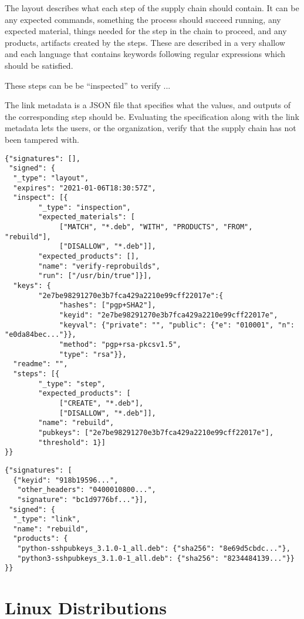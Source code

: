 \documentclass[../Main/thesis.tex]{subfiles}
\begin{document}
The layout describes what each step of the supply chain should contain. It can
be any expected commands, something the process should succeed running, any
expected material, things needed for the step in the chain to proceed, and any
products, artifacts created by the steps. These are described in a very shallow
and each language that contains keywords following regular expressions which
should be satisfied.

These steps can be be ``inspected'' to verify ...

The link metadata is a JSON file that specifies what the values, and outputs of
the corresponding step should be. Evaluating the specification along with the
link metadata lets the users, or the organization, verify that the supply chain
has not been tampered with. 

\begin{verbatim}
{"signatures": [],
 "signed": {
  "_type": "layout",
  "expires": "2021-01-06T18:30:57Z",
  "inspect": [{
        "_type": "inspection",
        "expected_materials": [
             ["MATCH", "*.deb", "WITH", "PRODUCTS", "FROM", "rebuild"],
             ["DISALLOW", "*.deb"]],
        "expected_products": [],
        "name": "verify-reprobuilds",
        "run": ["/usr/bin/true"]}],
  "keys": {
        "2e7be98291270e3b7fca429a2210e99cff22017e":{
             "hashes": ["pgp+SHA2"],
             "keyid": "2e7be98291270e3b7fca429a2210e99cff22017e",
             "keyval": {"private": "", "public": {"e": "010001", "n": "e0da84bec..."}},
             "method": "pgp+rsa-pkcsv1.5",
             "type": "rsa"}},
  "readme": "",
  "steps": [{
        "_type": "step",
        "expected_products": [
             ["CREATE", "*.deb"],
             ["DISALLOW", "*.deb"]],
        "name": "rebuild",
        "pubkeys": ["2e7be98291270e3b7fca429a2210e99cff22017e"],
        "threshold": 1}]
}}
\end{verbatim}

\begin{verbatim}
{"signatures": [
  {"keyid": "918b19596...",
   "other_headers": "0400010800...",
   "signature": "bc1d9776bf..."}],
 "signed": {
  "_type": "link",
  "name": "rebuild",
  "products": {
   "python-sshpubkeys_3.1.0-1_all.deb": {"sha256": "8e69d5cbdc..."},
   "python3-sshpubkeys_3.1.0-1_all.deb": {"sha256": "8234484139..."}}
}}
\end{verbatim}


\section{Linux Distributions}\label{sec:linux_distributions}
\end{document}

